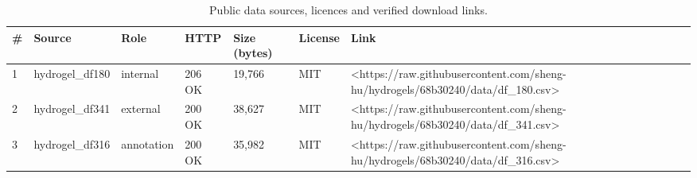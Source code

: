 \begin{table}
\caption{Public data sources, licences and verified download links.}
\label{tab:data_sources}
\begin{tabular}{lllllll}
\toprule
\# & Source & Role & HTTP & Size (bytes) & License & Link \\
\midrule
1 & hydrogel\_df180 & internal & 206 OK & 19,766 & MIT & <https://raw.githubusercontent.com/sheng-hu/hydrogels/68b30240/data/df\_180.csv> \\
2 & hydrogel\_df341 & external & 200 OK & 38,627 & MIT & <https://raw.githubusercontent.com/sheng-hu/hydrogels/68b30240/data/df\_341.csv> \\
3 & hydrogel\_df316 & annotation & 200 OK & 35,982 & MIT & <https://raw.githubusercontent.com/sheng-hu/hydrogels/68b30240/data/df\_316.csv> \\
\bottomrule
\end{tabular}
\end{table}
